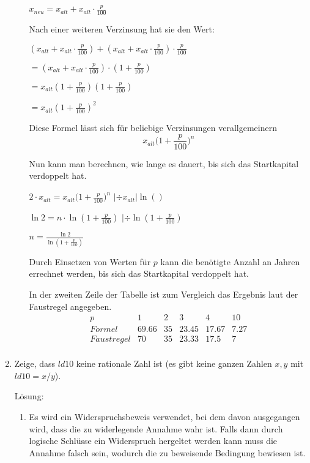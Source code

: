 \documentclass[../main.tex]{subfiles}
\begin{document}
\begin{enumerate}
\begin{enumerate}
		            \( x_{neu} = x_{alt} + x_{alt} \cdot \frac{p}{100}  \)

		            Nach einer weiteren Verzinsung hat sie den Wert:

		            \(  ( x_{alt} + x_{alt} \cdot \frac{p}{100} ) + ( x_{alt} + x_{alt} \cdot \frac{p}{100} ) \cdot \frac{p}{100}\)

		            \( =  ( x_{alt} + x_{alt} \cdot \frac{p}{100} ) \cdot ( 1+ \frac{p}{100}) \)

		            \( = x_{alt} (1 + \frac{p}{100}) (1 + \frac{p}{100}) \)

		            \( = x_{alt} (1+ \frac{p}{100})^2 \)

		            Diese Formel lässt sich für beliebige Verzinsungen verallgemeinern
		            \[ x_{alt} \Big(1 + \frac{p}{100} \Big)^n \]

		            Nun kann man berechnen, wie lange es dauert, bis sich das Startkapital verdoppelt hat.

		            \( 2 \cdot x_{alt} = x_{alt} \Big(1 + \frac{p}{100} \Big)^n \) \( | \div x_{alt} | \ln() \)

		            \( \ln 2 = n \cdot \ln(1 + \frac{p}{100}) \) \( | \div \ln (1 +\frac{p}{100}) \)

		            \( n = \frac{\ln 2}{\ln (1 + \frac{p}{100})} \)

		            Durch Einsetzen von Werten für \( p \) kann die benötigte Anzahl an Jahren errechnet werden,
		            bis sich das Startkapital verdoppelt hat.

		            In der zweiten Zeile der Tabelle ist zum Vergleich das
		            Ergebnis laut der Faustregel angegeben.
		            \[
			            \begin{array}{c|ccccc}
				            p          & 1     & 2  & 3     & 4     & 10   \\
				            \hline
				            Formel     & 69.66 & 35 & 23.45 & 17.67 & 7.27 \\
				            Faustregel & 70    & 35 & 23.33 & 17.5  & 7    \\
			            \end{array}
		            \]
	      \end{enumerate}
	\item Zeige, dass \( ld 10 \) keine rationale Zahl ist
	      (es gibt keine ganzen Zahlen \( x , y \) mit \( ld 10 = x / y \)).

	      Lösung:
	      \begin{enumerate}
		      \item Es wird ein Widerspruchsbeweis verwendet, bei dem davon ausgegangen wird,
		            dass die zu widerlegende Annahme wahr ist. Falls dann durch logische Schlüsse ein
		            Widerspruch hergeltet werden kann muss die Annahme falsch sein, wodurch die zu
				beweisende Bedingung bewiesen ist.
				

\end{enumerate}
\end{enumerate}
\end{document}
